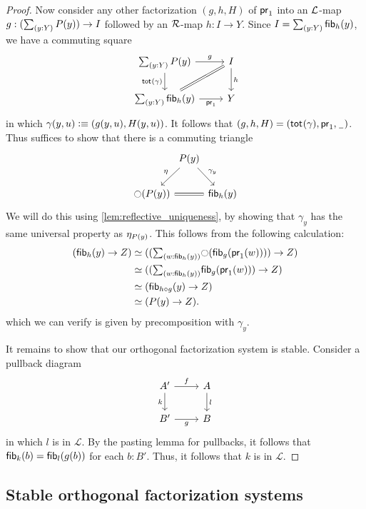 \begin{proof}
Now consider any other factorization $(g,h,H)$ of $\proj1$ into
an $\cL$-map $g:(\sm{y:Y}P(y))\to I$ followed by an $\cR$-map $h:I\to Y$. Since
$I=\sm{y:Y}\fib{h}{y}$, we have a commuting square
\begin{equation*}
\begin{tikzcd}
\sm{y:Y}P(y) \arrow[r,"g"] \arrow[d,swap,"{\total{\gamma}}"]
  & I \arrow[d,"h"] \\
\sm{y:Y}\fib{h}{y} \arrow[ur,equals] \arrow[r,swap,"\proj1"] & Y
\end{tikzcd}
\end{equation*}
in which $\gamma(y,u)\defeq \pairr{g(y,u),H(y,u)}$.
It follows that $(g,h,H)=(\total{\gamma},\proj1,\nameless)$.
Thus suffices to show that there is a commuting triangle
\begin{equation*}
\begin{tikzcd}[column sep=0]
& P(y) \arrow[dl,swap,"\modalunit"] \arrow[dr,"{\gamma_y}"] \\
\modal(P(y)) \arrow[rr,equals] & & \fib{h}{y}
\end{tikzcd}
\end{equation*}
We will do this using \cref{lem:reflective_uniqueness}, by showing that $\gamma_y$ has the same universal property as $\modalunit[P(y)]$.
This follows from the following calculation:
\begin{align*}
(\fib{h}{y}\to Z) & \eqvsym ((\sm{w:\fib{h}{y}}\modal(\fib{g}{\proj1(w)}))\to Z) \\
& \eqvsym ((\sm{w:\fib{h}{y}}\fib{g}{\proj1(w)})\to Z) \\
& \eqvsym (\fib{h\circ g}{y}\to Z) \\
& \eqvsym (P(y)\to Z).
\end{align*}
which we can verify is given by precomposition with $\gamma_y$.

It remains to show that our orthogonal factorization system is stable. Consider a pullback diagram
\begin{equation*}
\begin{tikzcd}
A' \arrow[d,swap,"k"] \arrow[r,"f"] & A \arrow[d,"l"] \\
B' \arrow[r,swap,"g"] & B
\end{tikzcd}
\end{equation*}
in which $l$ is in $\mathcal{L}$. By the pasting lemma for pullbacks, it
follows that $\fib{k}{b}=\fib{l}{g(b)}$ for each $b:B'$. Thus, it follows that
$k$ is in $\mathcal{L}$.
\end{proof}


\subsection{Stable orthogonal factorization systems}

